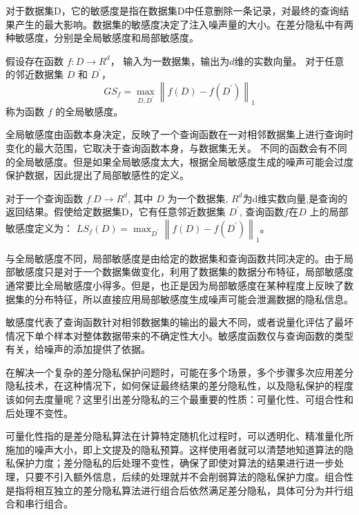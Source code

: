 对于数据集D，它的敏感度是指在数据集D中任意删除一条记录，对最终的查询结果产生的最大影响。数据集的敏感度决定了注入噪声量的大小。在差分隐私中有两种敏感度，分别是全局敏感度和局部敏感度。

\begin{define}[全局敏感度]\label{全局敏感度}
假设存在函数 $f: D \rightarrow R^{d}$， 输入为一数据集，输出为$d$维的实数向量。 对于任意的邻近数据集 $D$ 和 $D^{\prime}$，
$$
G S_{f}=\max _{D, D^{\prime}}\left\|f(D)-f\left(D^{\prime}\right)\right\|_{1}
$$
称为函数 $f$ 的全局敏感度。
\end{define}

全局敏感度由函数本身决定，反映了一个查询函数在一对相邻数据集上进行查询时变化的最大范围，它取决于查询函数本身，与数据集无关。
不同的函数会有不同的全局敏感度。但是如果全局敏感度太大，根据全局敏感度生成的噪声可能会过度保护数据，因此提出了局部敏感性的定义。

\begin{define}[局部敏感度]\label{局部敏感度}
对于一个查询函数 $f_{:} D \rightarrow R^{d}$, 其中 $D$ 为一个数据集, $R^{d}$为d维实数向量,是查询的返回结果。假使给定数据集D，它有任意邻近数据集 $D^{\prime}$, 查询函数$f$在$D$ 上的局部敏感度定义为：
$L S_{f}(D)=\max _{D^{\prime}}\left\|f(D)-f\left(D^{\prime}\right)\right\|_{1}$。
\end{define}

与全局敏感度不同，局部敏感度是由给定的数据集和查询函数共同决定的。由于局部敏感度只是对于一个数据集做变化，利用了数据集的数据分布特征，局部敏感度通常要比全局敏感度小得多。但是，也正是因为局部敏感度在某种程度上反映了数据集的分布特征，所以直接应用局部敏感度生成噪声可能会泄漏数据的隐私信息。

敏感度代表了查询函数针对相邻数据集的输出的最大不同，或者说量化评估了最坏情况下单个样本对整体数据带来的不确定性大小。敏感度函数仅与查询函数的类型有关，给噪声的添加提供了依据。

在解决一个复杂的差分隐私保护问题时，可能在多个场景，多个步骤多次应用差分隐私技术，在这种情况下，如何保证最终结果的差分隐私性，以及隐私保护的程度该如何去度量呢？这里引出差分隐私的三个最重要的性质：可量化性、可组合性和后处理不变性。

可量化性指的是差分隐私算法在计算特定随机化过程时，可以透明化、精准量化所施加的噪声大小，即上文提及的隐私预算。这样使用者就可以清楚地知道算法的隐私保护力度；差分隐私的后处理不变性，确保了即使对算法的结果进行进一步处理，只要不引入额外信息，后续的处理就并不会削弱算法的隐私保护力度。组合性是指将相互独立的差分隐私算法进行组合后依然满足差分隐私，具体可分为并行组合和串行组合。

